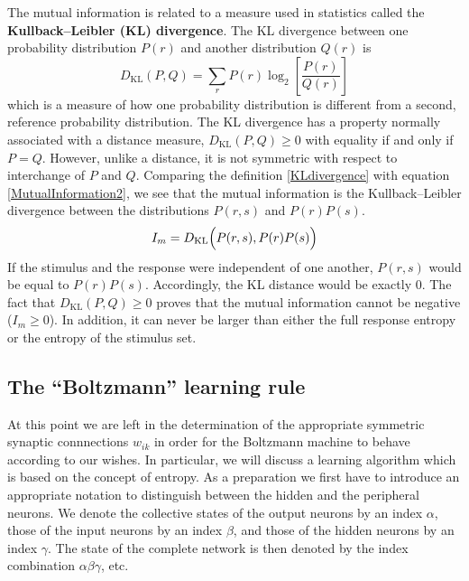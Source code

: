 The mutual information is related to a measure used in statistics called the \textbf{Kullback--Leibler (KL) divergence}. The KL divergence between one probability distribution $P(r)$ and another distribution $Q(r)$ is
\begin{equation}\label{KLdivergence}
\boxed{D_{\text{KL}}(P,Q)=\sum_rP(r)\log_2{\left[\frac{P(r)}{Q(r)}\right]}}
\end{equation}
which is a measure of how one probability distribution is different from a second, reference probability distribution. The KL divergence has a property normally associated with a distance measure, $D_{\text{KL}}(P,Q)\geq0$ with equality if and only if $P=Q$. However, unlike a distance, it is not symmetric with respect to interchange of $P$ and $Q$. Comparing the definition \eqref{KLdivergence} with equation \eqref{MutualInformation2}, we see that the mutual information is the Kullback--Leibler divergence between the distributions $P(r,s)$ and $P(r)P(s)$.
\begin{equation}\label{I_mKLdivergence}
I_m=D_{\text{KL}}\Bigl(P(r,s),P(r)P(s)\Bigr)%
\end{equation}
If the stimulus and the response were independent of one another, $P(r,s)$ would be equal to $P(r)P(s)$. Accordingly, the KL distance would be exactly 0. The fact that $D_{\text{KL}}(P,Q)\geq0$ proves that the mutual information cannot be negative ($I_m\geq0$). In addition, it can never be larger than either the full response entropy or the entropy of the stimulus set.
\subsection{The ``Boltzmann'' learning rule}

At this point we are left in the determination of the appropriate symmetric synaptic connnections $w_{ik}$ in order for the Boltzmann machine to behave according to our wishes. In particular, we will discuss a learning algorithm which is based on the concept of entropy. As a preparation we first have to introduce an appropriate notation to distinguish between the hidden and the peripheral neurons. We denote the collective states of the output neurons by an index $\alpha$, those of the input neurons by an index $\beta$, and those of the hidden neurons by an index $\gamma$. The state of the complete network is then denoted by the index combination $\alpha\beta\gamma$, etc.

